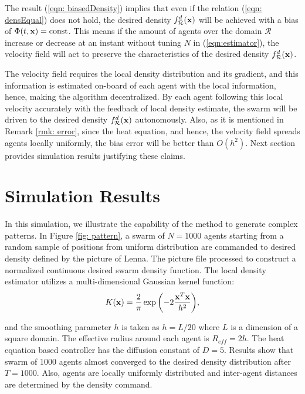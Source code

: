 \documentclass{ifacconf}
\newcommand{\Rconf}{{\mathcal R}}
\newcommand{\bx}{{\bf x}}
\begin{document}
%
\begin{rem}
	The result (\ref{eqn: biasedDensity}) implies that even if the relation (\ref{eqn: densEqual}) does not hold, the desired density $f_\Rconf^d(\bx)$ will be achieved with a bias of $\Phi(t,\bx) = \textnormal{const}$. This means if the amount of agents over the domain $\Rconf$ increase or decrease at an instant without tuning $N$ in (\ref{eqn:estimator}), the velocity field will act to preserve the characteristics of the desired density $f_\Rconf^d(\bx)$.
\end{rem}

The velocity field requires the local density distribution and its gradient, and this information is estimated on-board of each agent with the local information, hence, making the algorithm decentralized. By each agent following this local velocity accurately with the feedback of local density estimate, the swarm will be driven to the desired density $f_\Rconf^d(\bx)$ autonomously. Also, as it is mentioned in Remark \ref{rmk: error}, since the heat equation, and hence, the velocity field spreads agents locally uniformly, the bias error will be better than $O(h^2)$. Next section provides simulation results justifying these claims.


\section{Simulation Results}\label{sims}

In this simulation, we illustrate the capability of the method to generate complex patterns. In Figure \ref{fig: pattern}, a swarm of $N = 1000$ agents starting from a random sample of positions from uniform distribution are commanded to desired density defined by the picture of Lenna. The picture file processed to construct a normalized continuous desired swarm density function. The local density estimator utilizes a multi-dimensional Gaussian kernel function:
%
\vspace{3mm}
\begin{equation*}
	K(\bx) = \frac{2}{\pi} \exp\bigg({-2\frac{\bx^T\bx}{h^2}}\bigg), 
\end{equation*}

and the smoothing parameter $h$ is taken as $h = L/20$ where $L$ is a dimension of a square domain. The effective radius around each agent is $R_{eff} = 2h$. The heat equation based controller has the diffusion constant of $D = 5$. Results show that swarm of 1000 agents almost converged to the desired density distribution after $T = 1000$. Also, agents are locally uniformly distributed and inter-agent distances are determined by the density command. 
\end{document}
